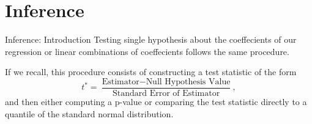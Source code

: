 \documentclass[notheorems,9pt]{beamer}
\begin{document}

\section{Inference}
\begin{frame}{Inference: Introduction} 
	\label{frame:inference-intro}
	Testing single hypothesis about the coeffecients of our regression or linear combinations of coeffecients follows the same procedure.

	If we recall, this procedure consists of constructing a test statistic of the form 
	\[
		t^* = \frac{\text{Estimator} - \text{Null Hypothesis Value}}{\text{Standard Error of Estimator}} 
	,\] 
	and then either computing a p-value or comparing the test statistic directly to a quantile of the standard normal distribution.
\end{frame}
\end{document}

